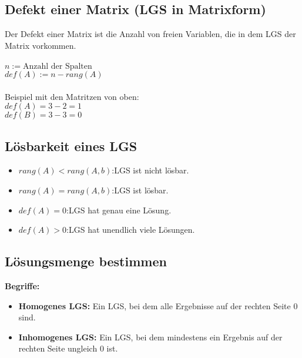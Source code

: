 \documentclass[12pt,a4paper]{article}
\begin{document}
\subsection{Defekt einer Matrix (LGS in Matrixform)}
Der Defekt einer Matrix ist die Anzahl von freien Variablen, die in dem LGS der Matrix vorkommen. \\ \\
$n := \text{Anzahl der Spalten}$ \\
$def(A) := n - rang(A)$ \\ \\
Beispiel mit den Matritzen von oben: \\
$def(A) = 3 - 2 = 1$\\
$def(B) = 3 - 3 = 0$

\subsection{Lösbarkeit eines LGS}
\begin{itemize}
    \item $rang(A) <  rang(A, b)$:\quad LGS ist nicht lösbar.
    \item $rang(A) = rang(A, b)$:\quad LGS ist lösbar.
    \item $def(A) = 0$:\quad LGS hat genau eine Lösung.
    \item $def(A) > 0$:\quad LGS hat unendlich viele Lösungen.
\end{itemize}
\subsection{Lösungsmenge bestimmen}
\textbf{Begriffe:}
\begin{itemize}
    \item \textbf{Homogenes LGS:} Ein LGS, bei dem alle Ergebnisse auf der rechten Seite 0 sind.
    \item \textbf{Inhomogenes LGS:} Ein LGS, bei dem mindestens ein Ergebnis auf der rechten Seite ungleich 0 ist.
\end{itemize}
\end{document}
